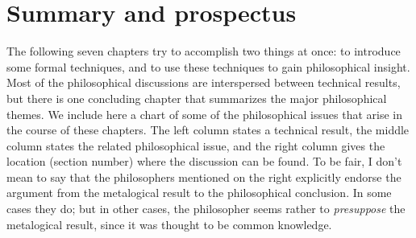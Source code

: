 


\section*{Summary and prospectus}

The following seven chapters try to accomplish two things at once: to
introduce some formal techniques, and to use these techniques to gain
philosophical insight.  Most of the philosophical discussions are
interspersed between technical results, but there is one concluding
chapter that summarizes the major philosophical themes.  We include
here a chart of some of the philosophical issues that arise in the
course of these chapters.  The left column states a technical result,
the middle column states the related philosophical issue, and the
right column gives the location (section number) where the discussion
can be found.  To be fair, I don't mean to say that the philosophers
mentioned on the right explicitly endorse the argument from the
metalogical result to the philosophical conclusion.  In some cases
they do; but in other cases, the philosopher seems rather to {\it
  presuppose} the metalogical result, since it was thought to be
common knowledge.


